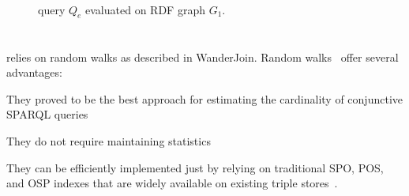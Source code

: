 \begin{figure}[t]
  \centering
  \begin{minipage}{0.49\textwidth}
    \subfloat[$(Q_e$]{
      
      \label{fig:q1-j2-1hop}
    } \\
  \end{minipage}
  \hfill
  \begin{minipage}{0.50\textwidth}
  \end{minipage}
  \caption{
    query $Q_e$  evaluated on RDF graph $G_1$.
  }
  \label{fig:random_walks_example}
\end{figure}



\section{\NAME}

\NAME relies on random walks as described in
WanderJoin\cite{li2016wanderjoin}. Random
walks~\cite{DBLP:journals/tods/LiWYZ19} offer several advantages:
\begin{inparaenum}[(1)]
  \item They proved to be the best approach for estimating the cardinality
    of conjunctive SPARQL queries~\cite{park2020g}
  \item They do not require maintaining statistics~\cite{gubichev2015query}
  \item They can be efficiently implemented just by relying on
    traditional SPO, POS, and OSP indexes that are widely available on
    existing triple stores~\cite{DBLP:conf/cidr/LeisRGK017}.
\end{inparaenum}


